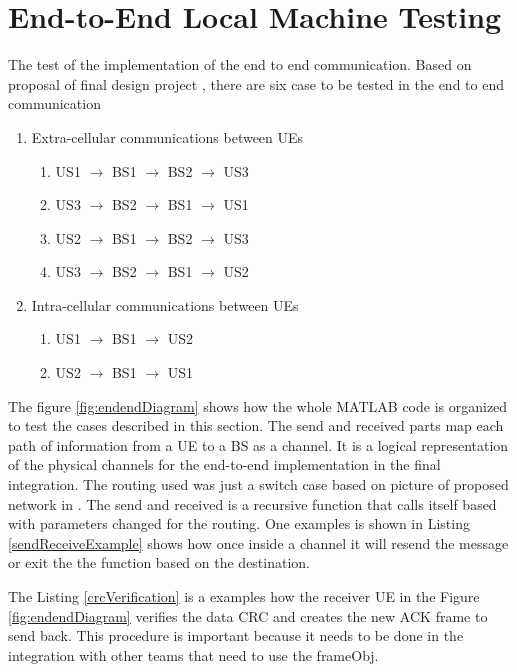 \section{End-to-End Local Machine Testing }
The test of the implementation of the end to end communication.
Based on proposal of final design project \cite{cdproj}, there
are six case to be tested in the end to end communication
\begin{enumerate}
  \item Extra-cellular communications between UEs
  \begin{enumerate}
    \item US1 $\rightarrow$ BS1 $\rightarrow$ BS2 $\rightarrow$ US3
    \item US3 $\rightarrow$ BS2 $\rightarrow$ BS1 $\rightarrow$ US1
		\item US2 $\rightarrow$ BS1 $\rightarrow$ BS2 $\rightarrow$ US3
		\item US3 $\rightarrow$ BS2 $\rightarrow$ BS1 $\rightarrow$ US2
  \end{enumerate}
  \item Intra-cellular communications between UEs
	  \begin{enumerate}
    \item US1 $\rightarrow$ BS1 $\rightarrow$ US2
    \item US2 $\rightarrow$ BS1 $\rightarrow$ US1
	\end{enumerate}
\end{enumerate}

The figure \ref{fig:endendDiagram} shows how the whole MATLAB code is organized to test the cases described in this section.
The send and received parts map each path of information from a UE  to a BS as a channel.  It is a logical representation of the physical channels for the end-to-end implementation in the final integration.
The routing used was just a switch case based on picture of proposed network in \cite{cdproj}.
The send and received is a recursive function that calls itself based with parameters changed for the routing.
One examples is shown in Listing \ref{sendReceiveExample} shows how once inside a channel it will resend the message or exit the the function based on the destination.


The Listing \ref{crcVerification} is a examples how the receiver UE in the Figure \ref{fig:endendDiagram} verifies the data CRC and creates the new ACK frame to send back.
This procedure is important because it needs to be done in the integration with other teams that need to use the frameObj.     

